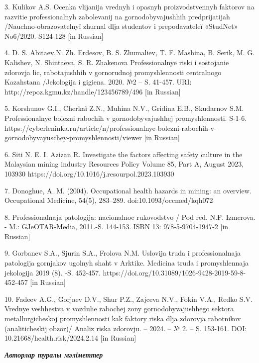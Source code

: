 3. Kulikov A.S. Ocenka vlijanija vrednyh i opasnyh proizvodstvennyh
faktorov na razvitie professional\textquotesingle nyh zabolevanij na
gornodobyvajushhih predprijatijah
/Nauchno-obrazovatel\textquotesingle nyĭ zhurnal dlja studentov i
prepodavateleĭ «StudNet» No6/2020.-S124-128 {[}in Russian{]}

4. D. S. Abitaev,N. Zh. Erdesov, B. S. Zhumaliev, T. F. Mashina, B.
Serik, M. G. Kalishev, N. Shintaeva, S. R. Zhakenova
Professional\textquotesingle nye riski i sostojanie
zdorov\textquotesingle ja lic, rabotajushhih v gornorudnoj
promyshlennosti central\textquotesingle nogo Kazahstana /Jekologija i
gigiena. 2020. №2 -- S. 41-457. URI:
http://repoz.kgmu.kz/handle/123456789/496 {[}in Russian{]}

5. Korshunov G.I., Cherkaĭ Z.N., Muhina N.V., Gridina E.B., Skudarnov
S.M. Professional\textquotesingle nye bolezni rabochih v
gornodobyvajushhej promyshlennosti. S-1-6.
https://cyberleninka.ru/article/n/professionalnye-bolezni-rabochih-v-gornodobyvayuschey-promyshlennosti/viewer
{[}in Russian{]}

6. Siti N. E. I. Azizan R. Investigate the factors affecting safety
culture in the Malaysian mining industry Resources Policy Volume 85,
Part A, August 2023, 103930
https://doi.org/10.1016/j.resourpol.2023.103930

7. Donoghue, A. M. (2004). Occupational health hazards in mining: an
overview. Occupational Medicine, 54(5), 283--289.
doi:10.1093/occmed/kqh072

8. Professional\textquotesingle naja patologija:
nacional\textquotesingle noe rukovodstvo / Pod red. N.F. Izmerova. - M.:
GJeOTAR-Media, 2011.-S. 144-153. ISBN 13: 978-5-9704-1947-2 {[}in
Russian{]}

9. Gorbanev S.A., Sjurin S.A., Frolova N.M. Uslovija truda i
professional\textquotesingle naja patologija gornjakov
ugol\textquotesingle nyh shaht v Arktike. Medicina truda i
promyshlennaja jekologija 2019 (8). -S. 452-457.
https://doi.org/10.31089/1026-9428-2019-59-8-452-457 {[}in Russian{]}

10. Fadeev A.G., Gorjaev D.V., Shur P.Z., Zajceva N.V., Fokin V.A.,
Red\textquotesingle ko S.V. Vrednye veshhestva v vozduhe rabochej zony
gornodobyvajushhego sektora metallurgicheskoj promyshlennosti kak
faktory riska dlja zdorov\textquotesingle ja rabotnikov (analiticheskij
obzor)/ Analiz riska zdorov\textquotesingle ju. -- 2024. -- № 2. -- S.
153-161. DOI: 10.21668/health.risk/2024.2.14 {[}in Russian{]}

\emph{{\bfseries Авторлар туралы мәліметтер}}

